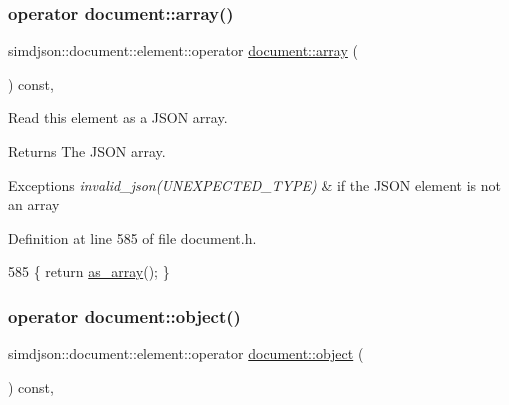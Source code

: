 \subsubsection{\texorpdfstring{operator document\+::array()}{operator document::array()}}
{\footnotesize\ttfamily simdjson\+::document\+::element\+::operator \hyperlink{classsimdjson_1_1document_1_1array}{document\+::array} (\begin{DoxyParamCaption}{ }\end{DoxyParamCaption}) const\hspace{0.3cm}{\ttfamily [inline]}, {\ttfamily [noexcept]}}



Read this element as a J\+S\+ON array. 

\begin{DoxyReturn}{Returns}
The J\+S\+ON array. 
\end{DoxyReturn}

\begin{DoxyExceptions}{Exceptions}
{\em invalid\+\_\+json(\+U\+N\+E\+X\+P\+E\+C\+T\+E\+D\+\_\+\+T\+Y\+P\+E)} & if the J\+S\+ON element is not an array \\
\hline
\end{DoxyExceptions}


Definition at line 585 of file document.\+h.


\begin{DoxyCode}
585 \{ \textcolor{keywordflow}{return} \hyperlink{classsimdjson_1_1document_1_1element_afbd5b1b6a674a2e38ba5267c6999579c}{as\_array}(); \}
\end{DoxyCode}
\mbox{\label{classsimdjson_1_1document_1_1element_ac9f7dd43808385b7ec89ea667a6cddc2}} 
\subsubsection{\texorpdfstring{operator document\+::object()}{operator document::object()}}
{\footnotesize\ttfamily simdjson\+::document\+::element\+::operator \hyperlink{classsimdjson_1_1document_1_1object}{document\+::object} (\begin{DoxyParamCaption}{ }\end{DoxyParamCaption}) const\hspace{0.3cm}{\ttfamily [inline]}, {\ttfamily [noexcept]}}



